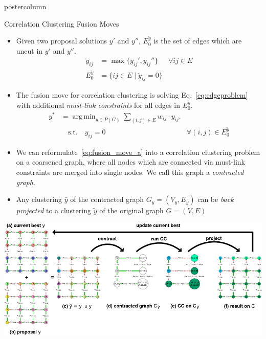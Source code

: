 \documentclass[final,hyperref={pdfpagelabels=false}]{beamer}
\DeclareMathOperator*{\argmin}{arg\,min}
\begin{document}
\begin{frame}
\begin{columns}
\begin{column}{.49\textwidth}
\begin{beamercolorbox}[center,wd=\textwidth]{postercolumn}
\begin{minipage}[T]{.95\textwidth}
{\begin{block}{Correlation Clustering Fusion Moves}
\begin{small}
\begin{itemize}
              \item Given two proposal solutions $y'$ and $y''$, $E_0^{\breve{y}}$ is the set of edges
              which are uncut in $y'$ and $y''$.
              \begin{align}
              \breve{y}_{ij}    & = \max\{ y_{ij}', y_{ij}''\}  & \forall {ij}\in E\\  %
              E_0^{\breve{y}}  & =  \{ ij \in E \; | \; \breve{y}_{ij} = 0 \}
              \end{align}
              \item The fusion move for correlation clustering is solving Eq.~\ref{eq:edgeproblem}
              with additional \emph{must-link constraints} for all edges in $E_0^{\breve{y}}$.
              \begin{align}
                y^* &= \argmin_{y \in P(G)} \sum_{ (i,j) \in E } w_{ij} \cdot y_{ij} \label{eq:fusion_move_a}.\\ 
                    &\quad \textrm{s.t.} \quad y_{ij} = 0 & \forall (i, j) \in E_0^{\breve{y}} \nonumber
              \end{align}
              
              \item We can reformulate~\ref{eq:fusion_move_a}
              into a correlation clustering problem on a coarsened graph, where all nodes which are connected
              via must-link constraints are merged into single nodes.  We call this graph a \emph{contracted graph}.

              \item Any clustering $\bar{y}$ of the contracted graph $G_y=(V_y,E_y)$ can be \emph{back projected} to a clustering $\tilde{y}$ of the original graph $G=(V,E)$
              \end{itemize}
              \end{small}
              \vfill
              \vspace{2cm}
              \centering
              \includegraphics[width=1.0\linewidth]{si-crop.pdf}



\end{block}}
\end{minipage}
\end{beamercolorbox}
\end{column}
\end{columns}
\end{frame}
\end{document}
